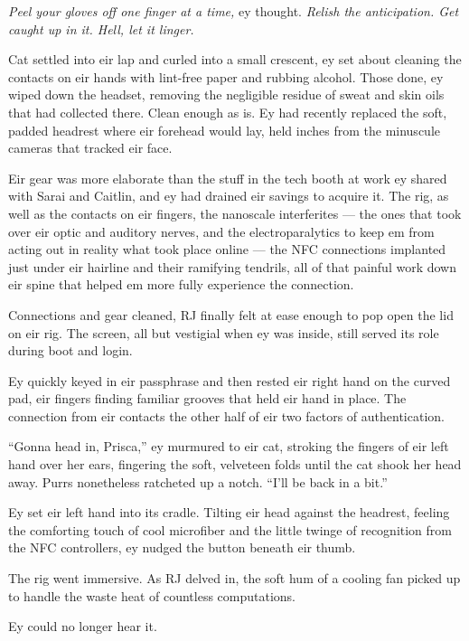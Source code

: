 \emph{Peel your gloves off one finger at a time,} ey thought. \emph{Relish the anticipation. Get caught up in it. Hell, let it linger.}

Cat settled into eir lap and curled into a small crescent, ey set about cleaning the contacts on eir hands with lint-free paper and rubbing alcohol. Those done, ey wiped down the headset, removing the negligible residue of sweat and skin oils that had collected there. Clean enough as is. Ey had recently replaced the soft, padded headrest where eir forehead would lay, held inches from the minuscule cameras that tracked eir face.

Eir gear was more elaborate than the stuff in the tech booth at work ey shared with Sarai and Caitlin, and ey had drained eir savings to acquire it. The rig, as well as the contacts on eir fingers, the nanoscale interferites — the ones that took over eir optic and auditory nerves, and the electroparalytics to keep em from acting out in reality what took place online — the NFC connections implanted just under eir hairline and their ramifying tendrils, all of that painful work down eir spine that helped em more fully experience the connection.

Connections and gear cleaned, RJ finally felt at ease enough to pop open the lid on eir rig. The screen, all but vestigial when ey was inside, still served its role during boot and login.

Ey quickly keyed in eir passphrase and then rested eir right hand on the curved pad, eir fingers finding familiar grooves that held eir hand in place. The connection from eir contacts the other half of eir two factors of authentication.

``Gonna head in, Prisca,'' ey murmured to eir cat, stroking the fingers of eir left hand over her ears, fingering the soft, velveteen folds until the cat shook her head away. Purrs nonetheless ratcheted up a notch. ``I'll be back in a bit.''

Ey set eir left hand into its cradle. Tilting eir head against the headrest, feeling the comforting touch of cool microfiber and the little twinge of recognition from the NFC controllers, ey nudged the button beneath eir thumb.

The rig went immersive. As RJ delved in, the soft hum of a cooling fan picked up to handle the waste heat of countless computations.

Ey could no longer hear it.
